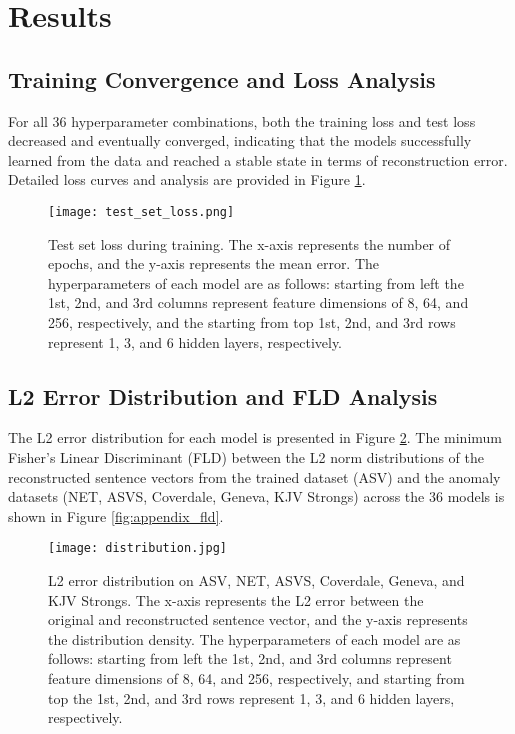 \section{Results}\label{sec:results}

\subsection{Training Convergence and Loss Analysis}

For all 36 hyperparameter combinations, both the training loss and test loss decreased and eventually converged, indicating that the models successfully learned from the data and reached a stable state in terms of reconstruction error. Detailed loss curves and analysis are provided in Figure \ref{fig:appendix_loss}.

\begin{figure}[htbp]
    \centering
    \texttt{[image: test\_set\_loss.png]}
    \caption{Test set loss during training. The x-axis represents the number of epochs, and the y-axis represents the mean error. The hyperparameters of each model are as follows: starting from left the 1st, 2nd, and 3rd columns represent feature dimensions of 8, 64, and 256, respectively, and the starting from top 1st, 2nd, and 3rd rows represent 1, 3, and 6 hidden layers, respectively.}
    \label{fig:appendix_loss}
\end{figure}

\subsection{L2 Error Distribution and FLD Analysis}

The L2 error distribution for each model is presented in Figure \ref{fig:appendix_l2_error}. The minimum Fisher’s Linear Discriminant (FLD) between the L2 norm distributions of the reconstructed sentence vectors from the trained dataset (ASV) and the anomaly datasets (NET, ASVS, Coverdale, Geneva, KJV Strongs) across the 36 models is shown in Figure \ref{fig:appendix_fld}.

\begin{figure}[htbp]
    \centering
    \texttt{[image: distribution.jpg]}
    \caption{L2 error distribution on ASV, NET, ASVS, Coverdale, Geneva, and KJV Strongs. The x-axis represents the L2 error between the original and reconstructed sentence vector, and the y-axis represents the distribution density. The hyperparameters of each model are as follows: starting from left the 1st, 2nd, and 3rd columns represent feature dimensions of 8, 64, and 256, respectively, and starting from top the 1st, 2nd, and 3rd rows represent 1, 3, and 6 hidden layers, respectively.}
    \label{fig:appendix_l2_error}
\end{figure}

